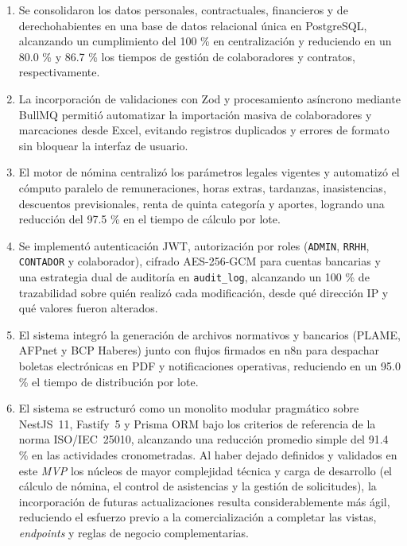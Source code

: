 \begin{enumerate}[leftmargin=*]
    \item Se consolidaron los datos personales, contractuales, 
    financieros y de derechohabientes en una base de datos relacional única en PostgreSQL, 
    alcanzando un cumplimiento del 100 \% en centralización y reduciendo en un 80.0 \% y 86.7 \% 
    los tiempos de gestión de colaboradores y contratos, respectivamente.

    \item La incorporación de validaciones con Zod y procesamiento asíncrono mediante BullMQ 
    permitió automatizar la importación masiva de colaboradores y marcaciones desde Excel, 
    evitando registros duplicados y errores de formato sin bloquear la interfaz de usuario.

    \item El motor de nómina centralizó los parámetros legales vigentes y 
    automatizó el cómputo paralelo de remuneraciones, horas extras, tardanzas, inasistencias, descuentos previsionales, 
    renta de quinta categoría y aportes, logrando una reducción del 97.5 \% en el tiempo de cálculo por lote.

    \item Se implementó autenticación JWT, autorización por roles
     (\texttt{ADMIN}, \texttt{RRHH}, \texttt{CONTADOR} y colaborador), 
     cifrado AES-256-GCM para cuentas bancarias y una estrategia dual de auditoría en \texttt{audit\_log}, 
     alcanzando un 100 \% de trazabilidad sobre quién realizó cada modificación, 
     desde qué dirección IP y qué valores fueron alterados.

    \item El sistema integró la generación de archivos normativos y 
    bancarios (PLAME, AFPnet y BCP Haberes) junto con flujos firmados en n8n para despachar boletas electrónicas en PDF y 
    notificaciones operativas, reduciendo en un 95.0 \% el tiempo de distribución por lote.

    \item El sistema se estructuró como un monolito modular pragmático sobre NestJS~11, 
    Fastify~5 y Prisma ORM bajo los criterios de referencia de la norma ISO/IEC~25010, alcanzando una reducción promedio simple del 91.4 \% 
    en las actividades cronometradas. Al haber dejado definidos y validados en este \textit{MVP} los núcleos de mayor complejidad técnica y 
    carga de desarrollo (el cálculo de nómina, el control de asistencias y la gestión de solicitudes), 
    la incorporación de futuras actualizaciones resulta considerablemente más ágil, 
    reduciendo el esfuerzo previo a la comercialización a completar las vistas, \textit{endpoints} y reglas de negocio complementarias.
    
\end{enumerate}